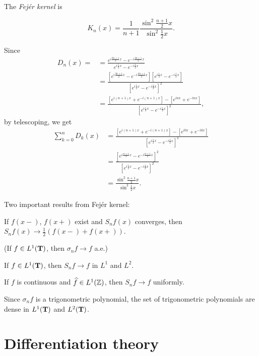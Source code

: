 \documentclass{../crs}
\begin{document}
\begin{defn}
The \emph{Fej\'er kernel} is
\end{defn}
\begin{thm}
\[K_n(x)=\frac1{n+1}\frac{\sin^2\frac{n+1}2x}{\sin^2\frac12x}.\]
\end{thm}
\begin{pf}
Since
\begin{align*}
D_n(x)=
&=\frac{e^{i\frac{2n+1}2x}-e^{-i\frac{2n+1}2x}}{e^{i\frac12x}-e^{-i\frac12x}}\\
&=\frac{[e^{i\frac{2n+1}2x}-e^{-i\frac{2n+1}2x}][e^{i\frac12x}-e^{-i\frac12x}]}{[e^{i\frac12x}-e^{-i\frac12x}]^2}\\
&=\frac{[e^{i(n+1)x}+e^{-i(n+1)x}]-[e^{inx}+e^{-inx}]}{[e^{i\frac12x}-e^{-i\frac12x}]^2},
\end{align*}
by telescoping, we get
\begin{align*}
\sum_{k=0}^nD_k(x)
&=\frac{[e^{i(n+1)x}+e^{-i(n+1)x}]-[e^{i0x}+e^{-i0x}]}{[e^{i\frac12x}-e^{-i\frac12x}]^2}\\
&=\frac{[e^{i\frac{n+1}2x}-e^{-i\frac{n+1}2x}]^2}{[e^{i\frac12x}-e^{-i\frac12x}]^2}\\
&=\frac{\sin^2\frac{n+1}2x}{\sin^2\frac12x}.
\end{align*}
\end{pf}

Two important results from Fej\'er kernel:
\begin{cond}
\item If $f(x-)$, $f(x+)$ exist and $S_nf(x)$ converges, then $S_nf(x)\to\frac12(f(x-)+f(x+))$.
\item (If $f\in L^1(\mathbf{T})$, then $\sigma_nf\to f$ a.e.)

\item If $f\in L^1(\mathbf{T})$, then $S_nf\to f$ in $L^1$ and $L^2$.
\item If $f$ is continuous and $\widehat{f}\in L^1(\mathbb{Z})$, then $S_nf\to f$ uniformly.
\item Since $\sigma_nf$ is a trigonometric polynomial, the set of trigonometric polynomials are dense in $L^1(\mathbf{T})$ and $L^2(\mathbf{T})$.
\end{cond}





\chapter{Differentiation theory}
\end{document}
